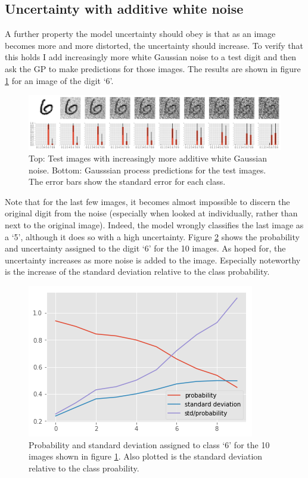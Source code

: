 \documentclass{article}
\begin{document}
\subsection{Uncertainty with additive white noise}
A further property the model uncertainty should obey is that as an image becomes more and more distorted, the uncertainty should increase. To verify that this holds I add increasingly more white Gaussian noise to a test digit and then ask the GP to make predictions for those images. The results are shown in figure \ref{fig/awgn_predictions} for an image of the digit `6'.
\begin{figure}
	\centering
	\includegraphics[width=1.0\textwidth]{awgn_predictions}
	\caption{Top: Test images with increasingly more additive white Gaussian noise. Bottom: Gausssian process predictions for the test images. The error bars show the standard error for each class.}
	\label{fig/awgn_predictions}
\end{figure}
Note that for the last few images, it becomes almost impossible to discern the original digit from the noise (especially when looked at individually, rather than next to the original image). Indeed, the model wrongly classifies the last image as a `5', although it does so with a high uncertainty. Figure \ref{fig/awgn_predictions_stds} shows the probability and uncertainty assigned to the digit `6' for the 10 images. As hoped for, the uncertainty increases as more noise is added to the image. Especially noteworthy is the increase of the standard deviation relative to the class probability.
\begin{figure}
	\centering
	\includegraphics[scale=0.4]{awgn_predictions_stds}
	\caption{Probability and standard deviation assigned to class `6' for the 10 images shown in figure \ref{fig/awgn_predictions}. Also plotted is the standard deviation relative to the class proability.}
	\label{fig/awgn_predictions_stds}
\end{figure}
\end{document}
